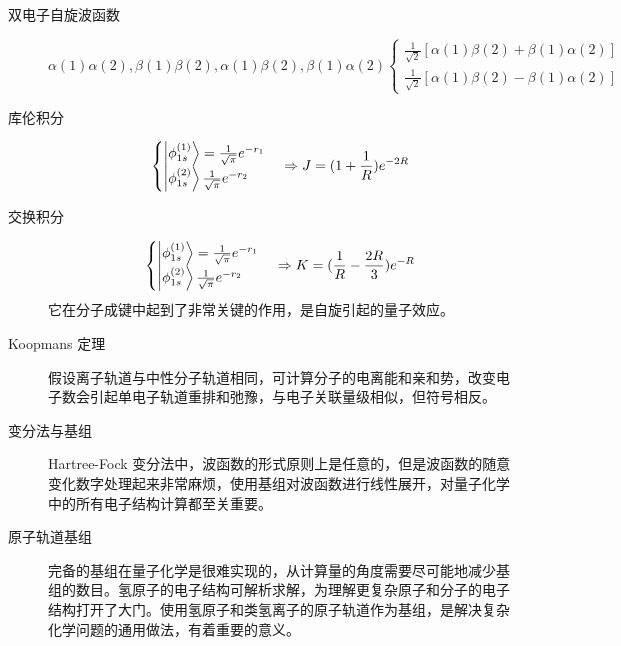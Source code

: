 \documentclass[12pt,a4paper,openany,twoside]{book}
\numberwithin{equation}{section}
\begin{document}
\begin{description}
          \item[双电子自旋波函数]
            \begin{equation}
              \alpha(1)\alpha(2),\beta(1)\beta(2),\alpha(1)\beta(2),\beta(1)\alpha(2)
              \begin{cases}
                \frac{1}{\sqrt{2}}[\alpha(1)\beta(2)+\beta(1)\alpha(2)]\\
                \frac{1}{\sqrt{2}}[\alpha(1)\beta(2)-\beta(1)\alpha(2)]
              \end{cases}
            \end{equation}

          \item[库伦积分]
            \begin{equation}
              \begin{cases}
                \ket{\phi_{1s}^{(1)}}=\frac{1}{\sqrt{\pi}}e^{-r_1}\\
                \ket{\phi_{1s}^{(2)}}\frac{1}{\sqrt{\pi}}e^{-r_2}
              \end{cases}
              \Rightarrow J=(1+\frac{1}{R})e^{-2R}
            \end{equation}
        
          \item[交换积分]
            \begin{equation}
              \begin{cases}
                \ket{\phi_{1s}^{(1)}}=\frac{1}{\sqrt{\pi}}e^{-r_1}\\
                \ket{\phi_{1s}^{(2)}}\frac{1}{\sqrt{\pi}}e^{-r_2}
              \end{cases}
              \Rightarrow K=(\frac{1}{R}-\frac{2R}{3})e^{-R}
            \end{equation}
            它在分子成键中起到了非常关键的作用，是自旋引起的量子效应。

          \item[Koopmans 定理]假设离子轨道与中性分子轨道相同，可计算分子的电离能和亲和势，改变电子数会引起单电子轨道重排和弛豫，与电子关联量级相似，但符号相反。

          \item[变分法与基组] Hartree-Fock 变分法中，波函数的形式原则上是任意的，但是波函数的随意变化数字处理起来非常麻烦，使用基组对波函数进行线性展开，对量子化学中的所有电子结构计算都至关重要。
        
          \item[原子轨道基组] 完备的基组在量子化学是很难实现的，从计算量的角度需要尽可能地减少基组的数目。氢原子的电子结构可解析求解，为理解更复杂原子和分子的电子结构打开了大门。使用氢原子和类氢离子的原子轨道作为基组，是解决复杂化学问题的通用做法，有着重要的意义。
        

\end{description}
\end{document}
